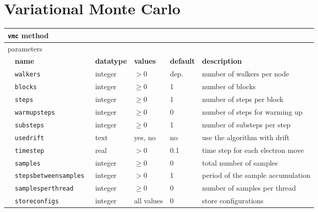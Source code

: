 \section{Variational Monte Carlo}
\label{sec:vmc}

\begin{table}[h]
\begin{center}
\begin{tabularx}{\textwidth}{l l l l l l }
\hline
\multicolumn{6}{l}{\texttt{vmc} method} \\
\hline
\multicolumn{2}{l}{parameters}  & \multicolumn{4}{l}{}\\
   &   \bfseries name     & \bfseries datatype & \bfseries values & \bfseries default   & \bfseries description \\
   &   \texttt{walkers             } &  integer  & $> 0$   & dep.& number of walkers per node  \\
   &   \texttt{blocks              } &  integer  & $\ge 0$ & 1   & number of blocks            \\
   &   \texttt{steps               } &  integer  & $\ge 0$ & 1   & number of steps per block   \\
   &   \texttt{warmupsteps         } &  integer  & $\ge 0$ & 0   & number of steps for warming up\\
   &   \texttt{substeps            } &  integer  & $\ge 0$ & 1   & number of substeps per step \\
   &   \texttt{usedrift            } &  text     & yes, no & no  & use the algorithm with drift\\
   &   \texttt{timestep            } &  real     & $> 0$   & 0.1 & time step for each electron move \\
   &   \texttt{samples             } &  integer  & $\ge 0$ & 0   & total number of samples \\
   &   \texttt{stepsbetweensamples } &  integer  & $> 0$   & 1   & period of the sample accumulation\\
   &   \texttt{samplesperthread    } &  integer  & $\ge 0$ & 0   & number of samples per thread  \\
   &   \texttt{storeconfigs        } &  integer  & all values & 0   & store configurations  \\
  \hline
\end{tabularx}
\end{center}
\end{table}

